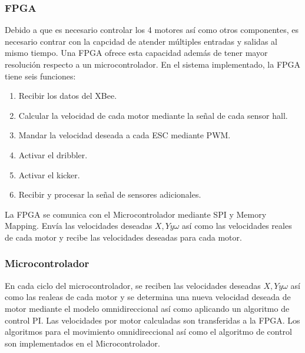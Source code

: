 \documentclass[twocolumn,10pt]{amrob}
\begin{document}
\subsubsection*{FPGA}
Debido a que es necesario controlar los 4 motores así como otros componentes, es necesario contrar con la capcidad de atender múltiples entradas y salidas al mismo tiempo. Una FPGA ofrece esta capacidad además de tener mayor resolución respecto a un microcontrolador. En el sistema implementado, la FPGA tiene seis funciones:
\begin{enumerate}
  \item Recibir los datos del XBee.
  \item Calcular la velocidad de cada motor mediante la señal de cada sensor hall.
  \item Mandar la velocidad deseada a cada ESC mediante PWM.
  \item Activar el dribbler.
  \item Activar el kicker.
  \item Recibir y procesar la señal de sensores adicionales.
\end{enumerate}
La FPGA se comunica con el Microcontrolador mediante SPI y Memory Mapping. Envía las velocidades deseadas \(X, Y y \omega\) así como las velocidades reales de cada motor y recibe las velocidades deseadas para cada motor.\par

\subsubsection*{Microcontrolador}
En cada ciclo del microcontrolador, se reciben las velocidades deseadas \(X, Y y \omega\) así como las realeas de cada motor y se determina una nueva velocidad deseada de motor mediante el modelo omnidireccional así como aplicando un algoritmo de control PI. Las velocidades por motor calculadas son transferidas a la FPGA. Los algoritmos para el movimiento omnidireccional así como el algoritmo de control son implementados en el Microcontrolador.

\end{document}
